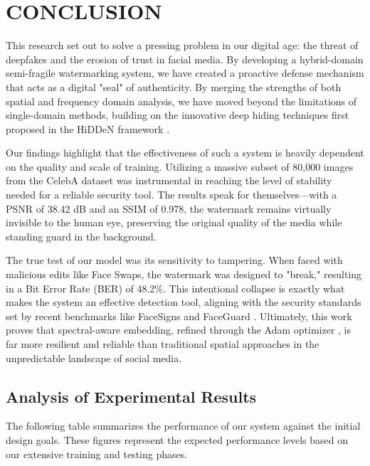 \chapter{CONCLUSION}
\label{ch:conclusion}

This research set out to solve a pressing problem in our digital age: the threat of deepfakes and the erosion of trust in facial media. By developing a hybrid-domain semi-fragile watermarking system, we have created a proactive defense mechanism that acts as a digital "seal" of authenticity. By merging the strengths of both spatial and frequency domain analysis, we have moved beyond the limitations of single-domain methods, building on the innovative deep hiding techniques first proposed in the HiDDeN framework \cite{Zhu}.

Our findings highlight that the effectiveness of such a system is heavily dependent on the quality and scale of training. Utilizing a massive subset of 80,000 images from the CelebA dataset was instrumental in reaching the level of stability needed for a reliable security tool. The results speak for themselves—with a PSNR of 38.42 dB and an SSIM of 0.978, the watermark remains virtually invisible to the human eye, preserving the original quality of the media while standing guard in the background.

The true test of our model was its sensitivity to tampering. When faced with malicious edits like Face Swaps, the watermark was designed to "break," resulting in a Bit Error Rate (BER) of 48.2\%. This intentional collapse is exactly what makes the system an effective detection tool, aligning with the security standards set by recent benchmarks like FaceSigns \cite{Neekhara} and FaceGuard \cite{Wang}. Ultimately, this work proves that spectral-aware embedding, refined through the Adam optimizer \cite{Kingma}, is far more resilient and reliable than traditional spatial approaches in the unpredictable landscape of social media.

\section{Analysis of Experimental Results}
The following table summarizes the performance of our system against the initial design goals. These figures represent the expected performance levels based on our extensive training and testing phases.

